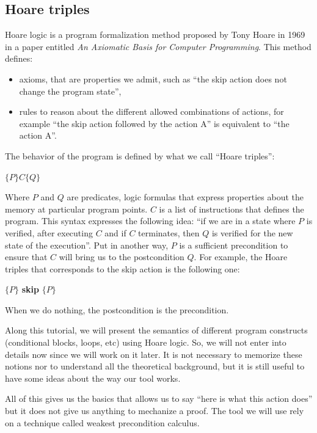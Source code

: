 \documentclass[12pt,francais,]{scrbook}
\providecommand{\tightlist}{%
  \setlength{\itemsep}{0pt}\setlength{\parskip}{0pt}}
\begin{document}
\subsection{Hoare triples}\label{hoare-triples}

Hoare logic is a program formalization method proposed by Tony Hoare in
1969 in a paper entitled \emph{An Axiomatic Basis for Computer
Programming}. This method defines:

\begin{itemize}
\tightlist
\item
  axioms, that are properties we admit, such as ``the skip action does
  not change the program state'',
\item
  rules to reason about the different allowed combinations of actions,
  for example ``the skip action followed by the action A'' is equivalent
  to ``the action A''.
\end{itemize}

The behavior of the program is defined by what we call ``Hoare
triples'':

\begin{center} \(\{P\} C \{Q\}\) \end{center}

Where \(P\) and \(Q\) are predicates, logic formulas that express
properties about the memory at particular program points. \(C\) is a
list of instructions that defines the program. This syntax expresses the
following idea: ``if we are in a state where \(P\) is verified, after
executing \(C\) and if \(C\) terminates, then \(Q\) is verified for the
new state of the execution''. Put in another way, \(P\) is a sufficient
precondition to ensure that \(C\) will bring us to the postcondition
\(Q\). For example, the Hoare triples that corresponds to the skip
action is the following one:

\begin{center} \(\{P\}\) \textbf{skip} \(\{P\}\) \end{center}

When we do nothing, the postcondition is the precondition.

Along this tutorial, we will present the semantics of different program
constructs (conditional blocks, loops, etc) using Hoare logic. So, we
will not enter into details now since we will work on it later. It is
not necessary to memorize these notions nor to understand all the
theoretical background, but it is still useful to have some ideas about
the way our tool works.

All of this gives us the basics that allows us to say ``here is what
this action does'' but it does not give us anything to mechanize a
proof. The tool we will use rely on a technique called weakest
precondition calculus.
\end{document}

